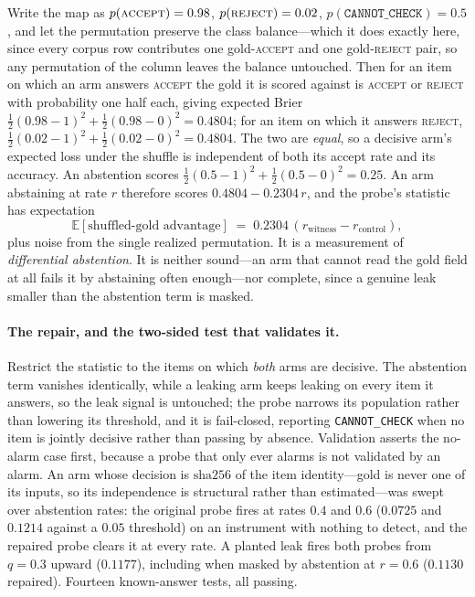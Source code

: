 Write the map as $p(\textsc{accept})=0.98$, $p(\textsc{reject})=0.02$, $p(\texttt{CANNOT\_CHECK})=0.5$, and let the permutation preserve the class balance---which it does exactly here, since every corpus row contributes one gold-\textsc{accept} and one gold-\textsc{reject} pair, so any permutation of the column leaves the balance untouched. Then for an item on which an arm answers \textsc{accept} the gold it is scored against is \textsc{accept} or \textsc{reject} with probability one half each, giving expected Brier $\tfrac12(0.98-1)^2+\tfrac12(0.98-0)^2 = 0.4804$; for an item on which it answers \textsc{reject}, $\tfrac12(0.02-1)^2+\tfrac12(0.02-0)^2 = 0.4804$. The two are \emph{equal}, so a decisive arm's expected loss under the shuffle is independent of both its accept rate and its accuracy. An abstention scores $\tfrac12(0.5-1)^2+\tfrac12(0.5-0)^2 = 0.25$. An arm abstaining at rate $r$ therefore scores $0.4804-0.2304\,r$, and the probe's statistic has expectation
\[
\mathbb{E}\left[\text{shuffled-gold advantage}\right] \;=\; 0.2304\,(r_{\text{witness}}-r_{\text{control}}),
\]
plus noise from the single realized permutation. It is a measurement of \emph{differential abstention}. It is neither sound---an arm that cannot read the gold field at all fails it by abstaining often enough---nor complete, since a genuine leak smaller than the abstention term is masked.

\paragraph{The repair, and the two-sided test that validates it.} Restrict the statistic to the items on which \emph{both} arms are decisive. The abstention term vanishes identically, while a leaking arm keeps leaking on every item it answers, so the leak signal is untouched; the probe narrows its population rather than lowering its threshold, and it is fail-closed, reporting \texttt{CANNOT\_CHECK} when no item is jointly decisive rather than passing by absence. Validation asserts the no-alarm case first, because a probe that only ever alarms is not validated by an alarm. An arm whose decision is $\mathrm{sha256}$ of the item identity---gold is never one of its inputs, so its independence is structural rather than estimated---was swept over abstention rates: the original probe fires at rates $0.4$ and $0.6$ ($0.0725$ and $0.1214$ against a $0.05$ threshold) on an instrument with nothing to detect, and the repaired probe clears it at every rate. A planted leak fires both probes from $q=0.3$ upward ($0.1177$), including when masked by abstention at $r=0.6$ ($0.1130$ repaired). Fourteen known-answer tests, all passing.

